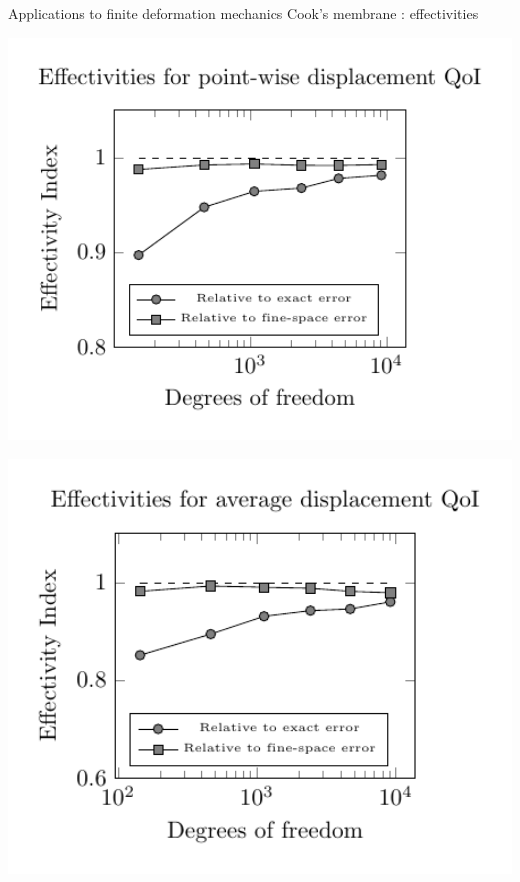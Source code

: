 \documentclass[fleqn]{beamer}
\begin{document}
\begin{frame}{Applications to finite deformation mechanics}
{Cook's membrane : effectivities}
\begin{minipage}{0.5\textwidth}
\hspace*{-2em}
\centering
\includegraphics[width=1.2\textwidth]{../img/mech_cooks_pw_effectivity_plot}
\end{minipage}%
\begin{minipage}{0.5\textwidth}
\centering
\vspace{0.5em}
\includegraphics[width=1.2\textwidth]{../img/mech_cooks_avg_disp_effectivity_plot}
\end{minipage}
\end{frame}
\end{document}
